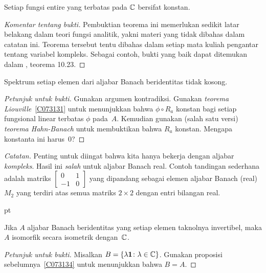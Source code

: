 \begin{thm}[Liouville]\label{C073131} Setiap fungsi entire yang terbatas pada $\mathbb{C}$ bersifat konstan.
\end{thm}

\begin{proof}[\emph{Komentar tentang bukti}] Pembuktian teorema ini memerlukan sedikit latar belakang
dalam teori fungsi analitik, yakni materi yang tidak dibahas dalam catatan ini. Teorema
tersebut tentu dibahas dalam setiap mata kuliah pengantar tentang variabel kompleks. Sebagai contoh, bukti yang
baik dapat ditemukan dalam \cite{Rudin:1987}, teorema 10.23.   \ns
\end{proof}

\begin{prop}\label{C073134} Spektrum setiap elemen dari aljabar Banach beridentitas tidak kosong.
\end{prop}

\begin{proof}[\emph{Petunjuk untuk bukti}] Gunakan argumen kontradiksi. Gunakan \emph{teorema Liouville}~\ref{C073131}
untuk menunjukkan bahwa $\phi \circ R_a$ konstan bagi setiap fungsional linear terbatas $\phi$ pada~$A$. Kemudian gunakan
(salah satu versi) \emph{teorema Hahn-Banach} untuk membuktikan bahwa $R_a$ konstan. Mengapa konstanta ini harus~$0$?   \ns
\end{proof}

\noindent\emph{Catatan.} Penting untuk diingat bahwa kita hanya bekerja dengan aljabar
\emph{kompleks}. Hasil ini \emph{salah} untuk aljabar Banach real. Contoh
tandingan sederhana adalah matriks $\begin{bmatrix}0 & 1 \\ -1 & 0 \end{bmatrix}$ yang dipandang sebagai
elemen aljabar Banach (real) $M_2$ yang terdiri atas semua matriks $2 \times 2$ dengan entri
bilangan real.

  pt

\begin{thm}\label{C073141} Jika $A$ aljabar Banach beridentitas yang setiap
elemen taknolnya invertibel, maka $A$ isomorfik secara isometrik dengan~$\mathbb{C}$.
\end{thm}

\begin{proof}[\emph{Petunjuk untuk bukti}] Misalkan $B = \{ \lambda\mathbf{1}\colon \lambda \in \mathbb{C}\}$. Gunakan
proposisi sebelumnya~\ref{C073134} untuk menunjukkan bahwa $B = A$.    \ns
\end{proof}

